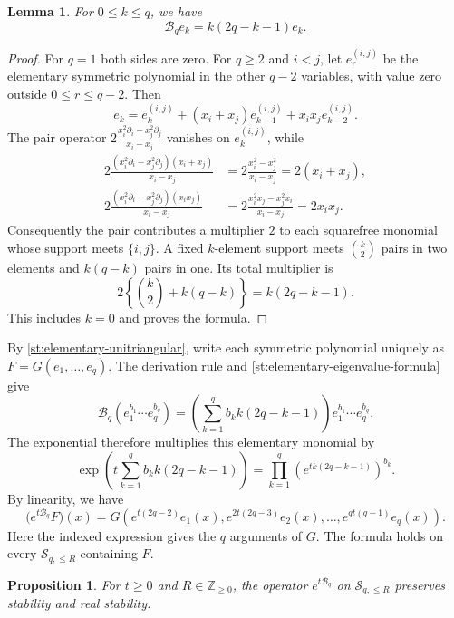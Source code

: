 \documentclass[reqno, 12pt]{article}
\numberwithin{equation}{section}
\newtheorem{proposition}[theorem]{Proposition}
\newtheorem{lemma}[theorem]{Lemma}
\theoremstyle{definition}
\newcommand{\NN}{\mathbb Z_{\geq0}}
\begin{document}
\begin{lemma}\label{st:elementary-eigenvalues}
For $0\leq k\leq q$, we have 
\begin{equation}\label{st:elementary-eigenvalue-formula}
\mathcal B_q e_k=k(2q-k-1)e_k.
\end{equation}
\end{lemma}
\begin{proof}
For $q=1$ both sides are zero.  For $q\geq2$ and $i<j$, let
$e_r^{(i,j)}$ be the elementary symmetric polynomial in the other
$q-2$ variables, with value zero outside $0\leq r\leq q-2$.
Then
\[
e_k=e_k^{(i,j)}+(x_i+x_j)e_{k-1}^{(i,j)}
                       +x_ix_je_{k-2}^{(i,j)}.
\]
The pair operator $2\frac{x_i^2\partial_i-x_j^2\partial_j}{x_i-x_j}$ vanishes on $e_k^{(i,j)}$, while
\begin{align*}
2\frac{(x_i^2\partial_i-x_j^2\partial_j)(x_i+x_j)}{x_i-x_j}
 &=2\frac{x_i^2-x_j^2}{x_i-x_j}=2(x_i+x_j),\\
2\frac{(x_i^2\partial_i-x_j^2\partial_j)(x_ix_j)}{x_i-x_j}
 &=2\frac{x_i^2x_j-x_j^2x_i}{x_i-x_j}=2x_ix_j.
\end{align*}
Consequently the pair contributes a multiplier $2$ to each
squarefree monomial whose support meets $\{i,j\}$.
A fixed $k$-element support meets $\binom{k}{2}$ pairs in two
elements and $k(q-k)$ pairs in one.  Its total multiplier is
\[
2\left\{\binom{k}{2}+k(q-k)\right\}=k(2q-k-1).
\]
This includes $k=0$ and proves the formula.
\end{proof}

By \cref{st:elementary-unitriangular}, write each symmetric
polynomial uniquely as $F=G(e_1,\ldots,e_q)$.  The derivation rule
and \eqref{st:elementary-eigenvalue-formula} give
\[
\mathcal B_q(e_1^{b_1}\cdots e_q^{b_q})
=\left(\sum_{k=1}^q b_k k(2q-k-1)\right)
 e_1^{b_1}\cdots e_q^{b_q}.
\]
The exponential therefore multiplies this elementary monomial by
\[\exp\left(t\sum_{k=1}^q b_k k(2q-k-1)\right)
=\prod_{k=1}^q\left(e^{tk(2q-k-1)}\right)^{b_k}.
\]
By linearity, we have
\begin{equation}\label{st:derivation-exponential}
\bigl(e^{t\mathcal B_q}F\bigr)(x)=G\left(e^{t(2q-2)}e_1(x),e^{2t(2q-3)}e_2(x),\ldots,e^{qt(q-1)}e_q(x)\right).
\end{equation}
Here the indexed expression gives the $q$ arguments of $G$.
The formula holds on every $\mathcal S_{q,\leq R}$ containing $F$.

\begin{proposition}\label{st:derivation-preserves}
For $t\geq0$ and $R\in\NN$, the operator $e^{t\mathcal B_q}$
on $\mathcal S_{q,\leq R}$ preserves stability and real stability.
\end{proposition}
\end{document}
